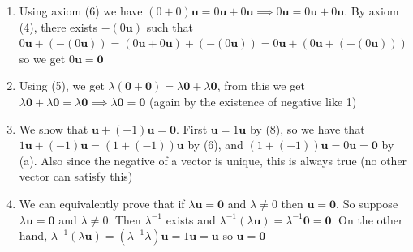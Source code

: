 \documentclass{report}
\begin{document}
\begin{myproof}
    
    \begin{enumerate}
        \item Using axiom (6) we have $(0+0)\mathbf{u} = 0\mathbf{u}  +0\mathbf{u} \implies 0\mathbf{u}  =0\mathbf{u}  +0\mathbf{u}  $. By axiom (4), there exists $-(0\mathbf{u})$ such that $0\mathbf{u} + (-(0\mathbf{u})) = (0\mathbf{u} + 0\mathbf{u})+(-(0\mathbf{u}))=0\mathbf{u}+(0\mathbf{u}+(-(0\mathbf{u}))) $ so we get $0\mathbf{u} = \mathbf{0}$
        \item Using (5), we get $\lambda (\mathbf{0+0})=\lambda \mathbf{0} +\lambda \mathbf{0} $, from this we get $\lambda \mathbf{0} +\lambda \mathbf{0}  = \lambda \mathbf{0} \implies \lambda \mathbf{0} =\mathbf{0}$ (again by the existence of negative like 1)
        \item We show that $\mathbf{u} + (-1)\mathbf{u}=\mathbf{0}$. First $\mathbf{u}=1\mathbf{u}$ by (8), so we have that $1\mathbf{u}+(-1)\mathbf{u} =$$(1+(-1))\mathbf{u}$ by (6), and $(1+(-1))\mathbf{u}=0\mathbf{u}=\mathbf{0}$ by (a). Also since the negative of a vector is unique, this is always true (no other vector can satisfy this)
        \item We can equivalently prove that if $\lambda \mathbf{u}=\mathbf{0}$ and $\lambda \ne 0$ then $\mathbf{u}=\mathbf{0}$. So suppose $\lambda \mathbf{u}=\mathbf{0}$ and $\lambda \ne 0$. Then $\lambda ^{-1}$ exists and $\lambda ^{-1}(\lambda \mathbf{u}) = \lambda ^{-1}\mathbf{0}=\mathbf{0}$. On the other hand, $\lambda ^{-1}(\lambda \mathbf{u}) = (\lambda ^{-1}\lambda )\mathbf{u}=1\mathbf {u}=\mathbf{u}$ so $\mathbf{u}=\mathbf{0}$
    \end{enumerate}

\end{myproof}
\end{document}
